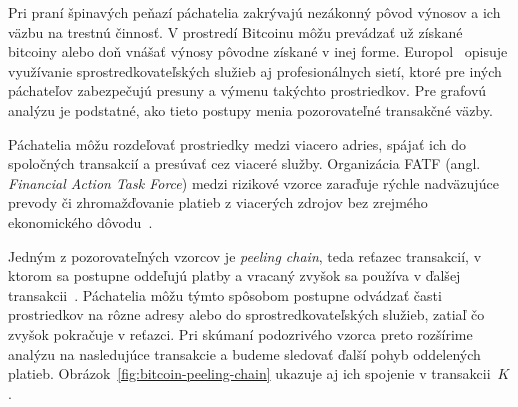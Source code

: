 Pri praní špinavých peňazí páchatelia zakrývajú nezákonný pôvod
výnosov a ich väzbu na trestnú činnosť. V prostredí Bitcoinu môžu
prevádzať už získané bitcoiny alebo doň vnášať výnosy pôvodne
získané v inej forme. Europol~\cite{europol2022crypto} opisuje
využívanie sprostredkovateľských služieb aj profesionálnych sietí,
ktoré pre iných páchateľov zabezpečujú presuny a výmenu takýchto
prostriedkov. Pre grafovú analýzu je podstatné, ako tieto postupy
menia pozorovateľné transakčné väzby.

Páchatelia môžu rozdeľovať prostriedky medzi viacero adries,
spájať ich do spoločných transakcií a presúvať cez viaceré služby.
Organizácia FATF (angl. \emph{Financial Action Task Force}) medzi
rizikové vzorce zaraďuje rýchle nadväzujúce prevody či zhromažďovanie
platieb z viacerých zdrojov bez zrejmého ekonomického
dôvodu~\cite{fatf2020redflags}.

Jedným z pozorovateľných vzorcov je \emph{peeling chain}, teda
reťazec transakcií, v ktorom sa postupne oddeľujú platby a vracaný
zvyšok sa používa v ďalšej transakcii~\cite{kappos2022peel}.
Páchatelia môžu týmto spôsobom postupne odvádzať časti prostriedkov
na rôzne adresy alebo do sprostredkovateľských služieb, zatiaľ čo
zvyšok pokračuje v reťazci. Pri skúmaní podozrivého vzorca preto
rozšírime analýzu na nasledujúce transakcie a budeme sledovať ďalší
pohyb oddelených platieb. Obrázok~\ref{fig:bitcoin-peeling-chain}
ukazuje aj ich spojenie v transakcii~$K$.

\begin{center}
  \begin{minipage}{\textwidth}
  \centering
  \captionsetup{type=figure}
  \label{fig:bitcoin-peeling-chain}
  \end{minipage}
\end{center}

